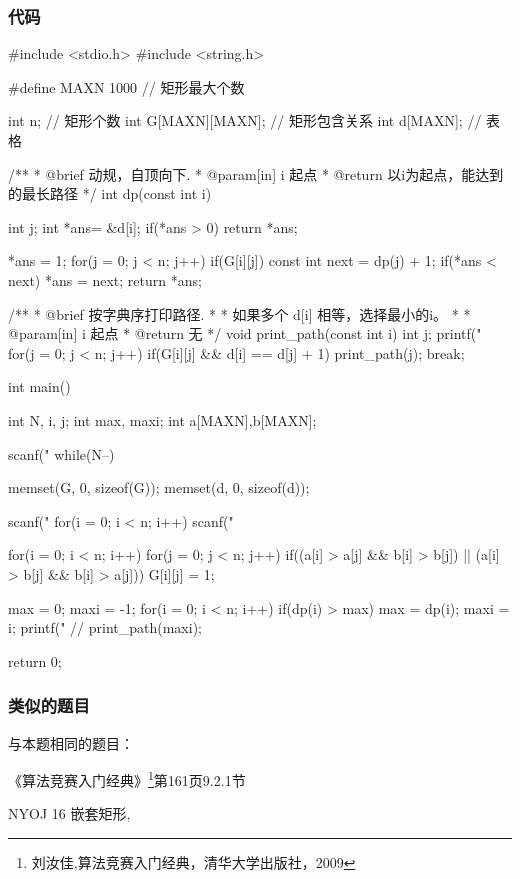 \subsubsection{代码}
\begin{Codex}[label=embedded_rectangles.c]
#include <stdio.h>
#include <string.h>

#define MAXN 1000 // 矩形最大个数

int n; // 矩形个数
int G[MAXN][MAXN]; // 矩形包含关系
int d[MAXN]; // 表格

/**
 * @brief 动规，自顶向下.
 * @param[in] i 起点
 * @return 以i为起点，能达到的最长路径
 */
int dp(const int i) {
    int j;
    int *ans= &d[i];
    if(*ans > 0) return *ans;

    *ans = 1;
    for(j = 0; j < n; j++) if(G[i][j]) {
        const int next = dp(j) + 1;
        if(*ans < next) *ans = next;
    }
    return *ans;
}

/**
 * @brief 按字典序打印路径.
 *
 * 如果多个 d[i] 相等，选择最小的i。
 *
 * @param[in] i 起点
 * @return 无
 */
void print_path(const int i) {
    int j;
    printf("%
    for(j = 0; j < n; j++) if(G[i][j] && d[i] == d[j] + 1) {
        print_path(j);
        break;
    }
}

int main() {
    int N, i, j;
    int max, maxi;
    int a[MAXN],b[MAXN];

    scanf("%
    while(N--) {
        memset(G, 0, sizeof(G));
        memset(d, 0, sizeof(d));

        scanf("%
        for(i = 0; i < n; i++) scanf("%

        for(i = 0; i < n; i++)
            for(j = 0; j < n; j++)
                if((a[i] > a[j] && b[i] > b[j]) ||
                    (a[i] > b[j] && b[i] > a[j])) G[i][j] = 1;

        max = 0;
        maxi = -1;
        for(i = 0; i < n; i++) if(dp(i) > max) {
            max = dp(i);
            maxi = i;
        }
        printf("%
        // print_path(maxi);
    }
    return 0;
}
\end{Codex}

\subsubsection{类似的题目}
与本题相同的题目：
\begindot
\item 《算法竞赛入门经典》\footnote{刘汝佳,算法竞赛入门经典，清华大学出版社，2009}第161页9.2.1节
\item  NYOJ 16 嵌套矩形, 
\myenddot

